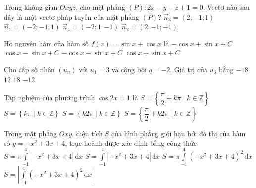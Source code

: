\begin{ex}%
	Trong không gian $Oxyz$, cho mặt phẳng $(P)\colon 2x-y-z+1=0$. Vectơ nào sau đây là một vectơ pháp tuyến của mặt phẳng $(P)$?
	\choice
	{$\overrightarrow{n}_3=(2;-1;1)$}
	{$\overrightarrow{n}_1=(-2;-1;1)$}
	{$\overrightarrow{n}_4=(-2;1;-1)$}
	{\True $\overrightarrow{n}_2=(2;-1;-1)$}
\end{ex}
\begin{ex}%
	Họ nguyên hàm của hàm số $f(x)=\sin x+\cos x$ là
	\choice
	{\True $-\cos x+\sin x+C$}
	{$\cos x-\sin x+C$}
	{$-\cos x-\sin x+C$}
	{$\cos x+\sin x+C$}
\end{ex}
\begin{ex}%
	Cho cấp số nhân $(u_n)$ với $u_1=3$ và cộng bội $q=-2$. Giá trị của $u_3$ bằng
	\choice
	{$-18$}
	{\True $12$}
	{$18$}
	{$-12$}
\end{ex}
\begin{ex}%
	Tập nghiệm của phương trình $\cos 2x=1$ là
	\choice
	{$S=\left\{\dfrac{\pi}{2}+k \pi \mid k \in \mathbb{Z}\right\}$}
	{\True $S=\left\{ k \pi \mid k \in \mathbb{Z}\right\}$}
	{$S=\left\{k 2 \pi \mid k \in \mathbb{Z}\right\}$}
	{$S=\left\{\dfrac{\pi}{2}+k2 \pi \mid k \in \mathbb{Z}\right\}$}
\end{ex}
\begin{ex}%
	Trong mặt phẳng $Oxy$, diện tích $S$ của hình phẳng giới hạn bởi đồ thị của hàm số $y=-x^2+3x+4$, trục hoành được xác định bằng công thức
	\choice
	{$S=\pi \displaystyle\int\limits_{-1}^4 \left|-x^2+3x+4\right| \mathrm{\,d}x$}
	{\True $S=\displaystyle\int\limits_{-1}^4 \left|-x^2+3x+4\right| \mathrm{\,d}x$}
	{$S=\pi \displaystyle\int\limits_{-1}^4(-x^2+3x+4)^2 \mathrm{\,d}x$}
	{$S=\left|\displaystyle\int\limits_{-1}^4(-x^2+3x+4)^2 \mathrm{\,d}x\right|$}
\end{ex}
